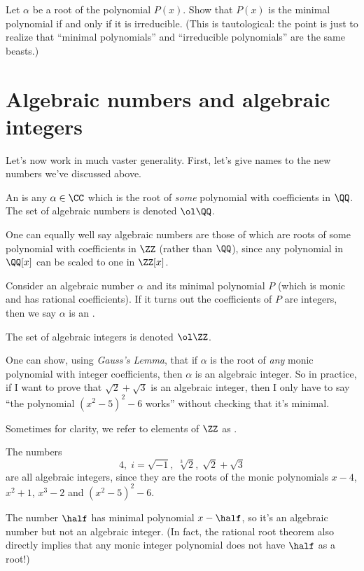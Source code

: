 \begin{ques}
	Let $\alpha$ be a root of the polynomial $P(x)$.
	Show that $P(x)$ is the minimal polynomial if and only if it is irreducible.
	(This is tautological: the point is just to realize that ``minimal polynomials'' and ``irreducible polynomials'' are the same beasts.)
\end{ques}

\section{Algebraic numbers and algebraic integers}
Let's now work in much vaster generality.
First, let's give names to the new numbers we've discussed above.
\begin{definition}
	An  is any $\alpha \in \CC$
	which is the root of \emph{some} polynomial with coefficients in $\QQ$.
	The set of algebraic numbers is denoted $\ol\QQ$.
\end{definition}
\begin{remark}
	One can equally well say algebraic numbers are those of which 
	are roots of some polynomial with coefficients in $\ZZ$ (rather than $\QQ$),
	since any polynomial in $\QQ[x]$ can be scaled to one in $\ZZ[x]$.
\end{remark}
\begin{definition}
	Consider an algebraic number $\alpha$ and its minimal polynomial $P$ (which is monic and has rational coefficients).
	If it turns out the coefficients of $P$ are integers, then we say $\alpha$ is an .

	The set of algebraic integers is denoted $\ol\ZZ$.
\end{definition}
\begin{remark}
	One can show, using \emph{Gauss's Lemma}, that if $\alpha$ is the root
	of \emph{any} monic polynomial with integer coefficients, then $\alpha$ is an algebraic integer.
	So in practice, if I want to prove that $\sqrt 2 + \sqrt 3$ is an algebraic integer,
	then I only have to say ``the polynomial $(x^2-5)^2-6$ works'' without checking that it's minimal.
\end{remark}
Sometimes for clarity, we refer to elements of $\ZZ$
as .
\begin{example}
	The numbers
	\[ 4, \; i = \sqrt{-1}, \; \sqrt[3]{2}, \; \sqrt2+\sqrt3 \]
	are all algebraic integers, since they are the roots of the monic polynomials
	$x-4$, $x^2+1$, $x^3-2$ and $(x^2-5)^2-6$.

	The number $\half$ has minimal polynomial $x - \half$,
	so it's an algebraic number but not an algebraic integer.
	(In fact, the rational root theorem also directly implies
	that any monic integer polynomial does not have $\half$ as a root!)
\end{example}
